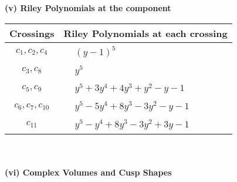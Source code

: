 \documentclass[1p]{elsarticle_modified}
\theoremstyle{definition}
\begin{document}
\newpage\renewcommand{\arraystretch}{1}
\flushleft \textbf{(v) Riley Polynomials at the component}\newline \\
\begin{tabular}{m{50pt}|m{274pt}}
Crossings & \hspace{64pt}Riley Polynomials at each crossing \\
\hline $$\begin{aligned}c_{1},c_{2},c_{4}\end{aligned}$$&$\begin{aligned}
&(y-1)^5
\end{aligned}$\\
\hline $$\begin{aligned}c_{3},c_{8}\end{aligned}$$&$\begin{aligned}
&y^5
\end{aligned}$\\
\hline $$\begin{aligned}c_{5},c_{9}\end{aligned}$$&$\begin{aligned}
&y^5+3 y^4+4 y^3+y^2- y-1
\end{aligned}$\\
\hline $$\begin{aligned}c_{6},c_{7},c_{10}\end{aligned}$$&$\begin{aligned}
&y^5-5 y^4+8 y^3-3 y^2- y-1
\end{aligned}$\\
\hline $$\begin{aligned}c_{11}\end{aligned}$$&$\begin{aligned}
&y^5- y^4+8 y^3-3 y^2+3 y-1
\end{aligned}$\\
\hline
\end{tabular}\\~\\
\newpage\flushleft \textbf{(vi) Complex Volumes and Cusp Shapes}
\end{document}
